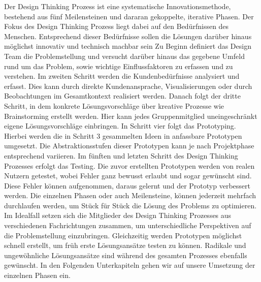 Der Design Thinking Prozess ist eine systematische Innovationsmethode, bestehend aus fünf Meilensteinen und dararan gekoppelte, iterative Phasen. Der Fokus des Design Thinking Prozess liegt dabei auf den Bedürfnissen des Menschen. Entsprechend dieser Bedürfnisse sollen die Lösungen darüber hinaus möglichst innovativ und technisch machbar sein
Zu Beginn definiert das Design Team die Problemstellung und versucht darüber hinaus das gegebene Umfeld rund um das Problem, sowie wichtige Einflussfaktoren zu erfassen und zu verstehen.
Im zweiten Schritt werden die Kundenbedürfnisse analysiert und erfasst. Dies kann durch direkte Kundenansprache, Visualisierungen oder durch Beobachtungen im Gesamtkontext realisiert werden.
Danach folgt der dritte Schritt, in dem konkrete Lösungsvorschläge über kreative Prozesse wie Brainstorming erstellt werden. Hier kann jedes Gruppenmitglied uneingeschränkt eigene Lösungsvorschläge einbringen.
In Schritt vier folgt das Prototyping. Hierbei werden die in Schritt 3 gesammelten Ideen in anfassbare Prototypen umgesetzt. Die Abstraktionsstufen dieser Prototypen kann je nach Projektphase entsprechend variieren.
Im fünften und letzten Schritt des Design Thinking Prozesses erfolgt das Testing. Die zuvor erstellten Prototypen werden von realen Nutzern getestet, wobei Fehler ganz bewusst erlaubt und sogar gewünscht sind. Diese Fehler können aufgenommen, daraus gelernt und der Prototyp verbessert werden. 
Die einzelnen Phasen oder auch Meilensteine, können jederzeit mehrfach durchlaufen werden, um Stück für Stück die Lösung des Problems zu optimieren. Im Idealfall setzen sich die Mitglieder des Design Thinking Prozesses aus verschiedenen Fachrichtungen zusammen, um unterschiedliche Perspektiven auf die Problemstellung einzubringen. Gleichzeitig werden Prototypen möglichst schnell erstellt, um früh erste Lösungsansätze testen zu können. Radikale und ungewöhnliche Lösungsansätze sind während des gesamten Prozesses ebenfalls gewünscht.
In den Folgenden Unterkapiteln gehen wir auf unsere Umsetzung der einzelnen Phasen ein.